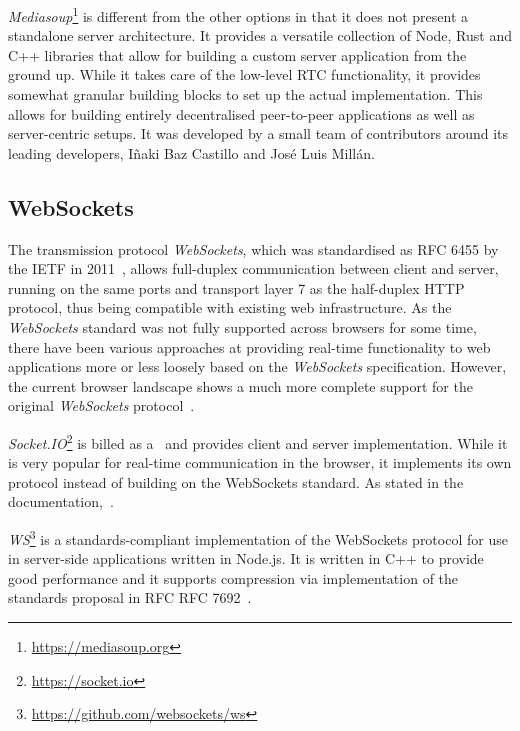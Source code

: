 \emph{Mediasoup}\footnote{\url{https://mediasoup.org}} is different from the other options in that it does not present a standalone server architecture.
It provides a versatile collection of Node, Rust and C++ libraries that allow for building a custom server application from the ground up.
While it takes care of the low-level \ac{RTC} functionality, it provides somewhat granular building blocks to set up the actual implementation.
This allows for building entirely decentralised peer-to-peer applications as well as server-centric setups.
It was developed by a small team of contributors around its leading developers, Iñaki Baz Castillo and José Luis Millán.

\subsection{WebSockets}

The transmission protocol \emph{WebSockets}, which was standardised as \ac{RFC} 6455 by the \ac{IETF} in 2011~\parencite{webSocketsProtocolRfc}, allows full-duplex communication between client and server, running on the same ports and transport layer 7 as the half-duplex \ac{HTTP} protocol, thus being compatible with existing web infrastructure.
As the \emph{WebSockets} standard was not fully supported across browsers for some time, there have been various approaches at providing real-time functionality to web applications more or less loosely based on the \emph{WebSockets} specification.
However, the current browser landscape shows a much more complete support for the original \emph{WebSockets} protocol~\parencite{canIUseWebSockets}.



\emph{Socket.IO}\footnote{\url{https://socket.io}} is billed as a~ and provides client and server implementation.
While it is very popular for real-time communication in the browser, it implements its own protocol instead of building on the WebSockets standard.
As stated in the documentation,~.

\emph{WS}\footnote{\url{https://github.com/websockets/ws}} is a standards-compliant implementation of the WebSockets protocol for use in server-side applications written in Node.js.
It is written in C++ to provide good performance and it supports compression via implementation of the standards proposal in \ac{RFC} RFC 7692~.

